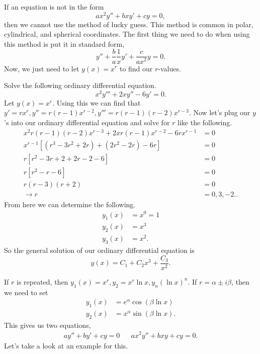 If an equation is not in the form 
\[
ax^2y'' + bxy'+cy=0
,\] then we cannot use the method of lucky guess. This method is common in polar, cylindrical, and spherical coordinates. The first thing we need to do when using this method is put it in standard form,
\[
y''+\frac{b}{a}\frac{1}{x}y'+\frac{c}{ax^2}y=0
.\] 
Now, we just need to let $y(x)=x^{r}$ to find our $r$-values.
\begin{eg}
  Solve the following ordinary differential equation.
  \[
  x^2y'''+2xy''-6y'=0
  .\] 
  Let $y(x)=x^{r}$. Using this we can find that $y'=rx^{r}, y''=r(r-1)x^{r-2},y'''=r(r-1)(r-2)x^{r-3}$. Now let's plug our $y$'s into our ordinary differential equation and solve for $r$ like the following.
  \begin{align*}
    x^2r(r-1)(r-2)x^{r-3}+2xr(r-1)x^{r-2}-6rx^{r-1}&=0\\
    x^{r-1}\left[ \left( r^{3}-3r^2+2r \right) + \left( 2r^2-2r \right) -6r  \right]&=0\\
    r\left[ r^2-3r+2+2r-2-6 \right] &=0\\
    r\left[ r^2-r-6 \right]&=0\\
    r(r-3)(r+2)&=0\\
    \to r&=0,3,-2.
  .\end{align*}
  From here we can determine the following.
  \begin{align*}
    y_1(x)&=x^{0}=1\\
    y_2(x)&=x^{3}\\
    y_3(x)&=x^{2}
  .\end{align*}
  So the general solution of our ordinary differential equation is 
  \[
    y(x)=C_1+C_2x^{3}+\frac{C_3}{x^2} 
  .\] 
\end{eg}
  If $r$ is repeated, then $y_1(x)=x^{r},y_2=x^{r}\ln x,y_{n}(\ln x)^n$. If $r=\alpha\pm i\beta$, then we need to set 
  \begin{align*}
    y_1(x)&=e^{\alpha}\cos(\beta\ln x)\\
    y_2(x)&=x^{\alpha}\sin(\beta\ln x)
  .\end{align*}
  This gives us two equations,
  \begin{align*}
    ay''+by'+cy=0 && ax^2y''+bxy+cy=0
  .\end{align*}
  Let's take a look at an example for this.
